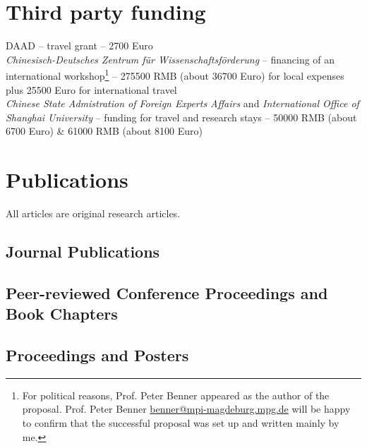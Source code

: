 \documentclass[11pt, a4paper]{article} %
\newcommand{\years}[1]{\marginnote{\scriptsize #1}} %
\begin{document}
\newpage
\section*{Third party funding}

\years{2017} DAAD -- travel grant -- 2700 Euro \\

\years{2016} \emph{Chinesisch-Deutsches Zentrum f\"ur Wissenschaftsf\"orderung} -- financing of an international workshop\footnote{For political reasons, Prof. Peter Benner appeared as the author of the proposal. Prof. Peter Benner \href{mailto:benner@mpi-mageburg.mpg.de}{benner@mpi-magdeburg.mpg.de} will be happy to confirm that the successful proposal was set up and written mainly by me.} -- 275500 RMB (about 36700 Euro) for local expenses plus 25500 Euro for international travel \\

\years{2015\&2016} \emph{Chinese State Admistration of Foreign Experts Affairs} and \emph{International Office of Shanghai University} -- funding for travel and research stays -- 50000 RMB (about 6700 Euro) \& 61000 RMB (about 8100 Euro)


\newpage
\section*{Publications}

All articles are original research articles.
\vspace{.1in}
\subsection*{Journal Publications}


\vspace{.1in}
\newpage
\subsection*{Peer-reviewed Conference Proceedings and Book Chapters}


\newpage
\vspace{.1in}
\subsection*{Proceedings and Posters}

\end{document}
